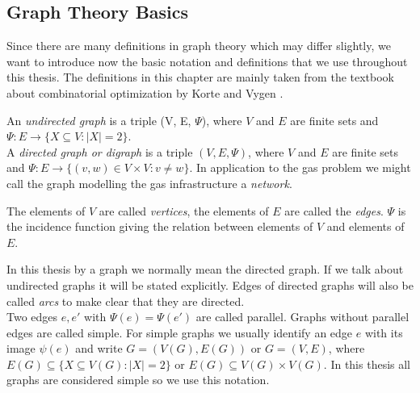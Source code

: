 \subsection{Graph Theory Basics}
Since there are many definitions in graph theory which may differ slightly, we want to introduce now the basic notation 
and definitions that we use throughout this thesis. The definitions in this chapter are mainly taken from the textbook 
about combinatorial optimization by Korte and Vygen \cite{KorteVygenCombOpt2007}.

\begin{definition}

An \textit{undirected graph} is a triple (V, E, $\Psi$), where $V$ and $E$ are finite sets and
$\Psi: E\to \{X \subseteq V: |X| = 2\}$. \\
A \textit{directed graph or digraph} is a triple $(V, E, \Psi)$,
where $V$ and $E$ are finite sets and $\Psi : E \to \{(v, w) \in V \times V : v \neq w\}$. 
In application to the gas problem we might call the graph modelling the gas infrastructure a \textit{network}. 
\end{definition}
 
The elements of $V$ are called \textit{vertices}, the elements of $E$ are called the \textit{edges}. $\Psi$ is the 
incidence function giving the relation between elements of $V$ and elements of $E$. 

In this thesis by a graph we normally mean the directed graph. If we talk about undirected graphs it will be stated 
explicitly. Edges of directed graphs will also be called \textit{arcs} to make clear that they are directed.\\

Two edges $e, e'$ with $\Psi(e) = \Psi ( e')$ are called parallel. Graphs without parallel
edges are called simple. For simple graphs we usually identify an edge $e$ with its
image $\psi(e)$ and write $G = (V(G), E(G))$ or $G=(V,E)$, where $E(G) \subseteq \{X \subseteq V(G) : |X| = 2\}$
or $E(G) \subseteq V(G) \times V(G)$. %
In this thesis all graphs are considered simple so we use this notation. 
 
